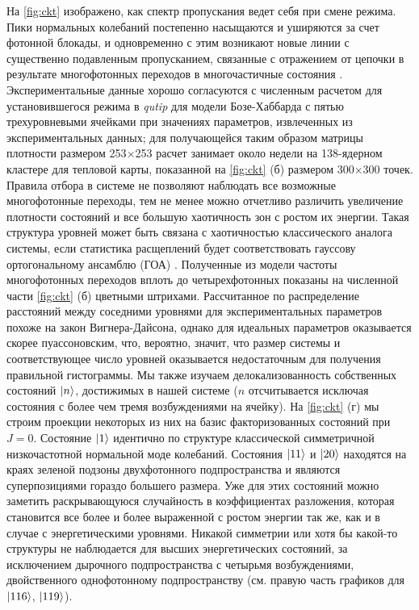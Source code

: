 \documentclass[14pt, a4paper]{extreport}
\DeclarePairedDelimiter\ket{\lvert}{\rangle}
\numberwithin{equation}{section}
\begin{document}
На \autoref{fig:ckt} изображено, как спектр пропускания ведет себя при смене режима. Пики нормальных колебаний постепенно насыщаются и уширяются за счет фотонной блокады, и одновременно с этим возникают новые линии с существенно подавленным пропусканием, связанные с отражением от цепочки в результате многофотонных переходов в многочастичные состояния \cite{Biella2015, fedorov2020light, roberts2020driven}. Экспериментальные данные хорошо согласуются с численным расчетом для установившегося режима в \textit{qutip} \cite{johansson2013qutip} для модели Бозе-Хаббарда с пятью трехуровневыми ячейками при значениях параметров, извлеченных из экспериментальных данных; для получающейся таким образом матрицы плотности размером 253$\times$253 расчет занимает около недели на 138-ядерном кластере для тепловой карты, показанной на \autoref{fig:ckt} (б) размером 300$\times$300 точек. Правила отбора в системе не позволяют наблюдать все возможные многофотонные переходы, тем не менее можно отчетливо различить увеличение плотности состояний и все большую хаотичность зон с ростом их энергии. Такая структура уровней может быть связана с хаотичностью классического аналога системы, если статистика расщеплений будет соответствовать гауссову ортогональному ансамблю (ГОА) \cite{bohigas1984characterization,zimmermann1986manifestation,kolovsky2004quantum, livan2018introduction}. Полученные из модели частоты многофотонных переходов вплоть до четырехфотонных показаны на численной части \autoref{fig:ckt} (б) цветными штрихами. Рассчитанное по распределение расстояний между соседними уровнями для экспериментальных параметров похоже на закон Вигнера-Дайсона, однако для идеальных параметров оказывается скорее пуассоновским, что, вероятно, значит, что размер системы и соответствующее число уровней оказывается недостаточным для получения правильной гистограммы. Мы также изучаем делокализованность собственных состояний $\ket{n}$, достижимых в нашей системе ($n$ отсчитывается исключая состояния с более чем тремя возбуждениями на ячейку). На \autoref{fig:ckt} (г) мы строим проекции некоторых из них на базис факторизованных состояний при $J=0$. Состояние $\ket{1}$ идентично по структуре классической симметричной низкочастотной нормальной моде колебаний. Состояния $\ket{11}$ и $\ket{20}$ находятся на краях зеленой подзоны двухфотонного подпространства и являются суперпозициями гораздо большего размера. Уже для этих состояний можно заметить раскрывающуюся случайность в коэффициентах разложения, которая становится все более и более выраженной с ростом энергии так же, как и в случае с энергетическими уровнями. Никакой симметрии или хотя бы какой-то структуры не наблюдается для высших энергетических состояний, за исключением дырочного подпространства с четырьмя возбуждениями, двойственного однофотонному подпространству (см. правую часть графиков для $\ket{116}$, $\ket{119}$).
\end{document}
